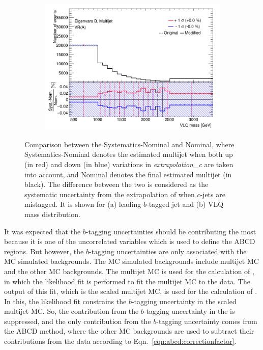 \begin{itemize}
\begin{figure}[hbt!]
		\begin{subfigure}{.35\textwidth}
			\centering
			\includegraphics[width=\linewidth,height=\textheight,keepaspectratio]{VR_B_VLQM_Multijets.png}
			\caption{}
			\label{fig:uncertainties:systematics:btagging:extra:c:vlqm}
		\end{subfigure}
		\caption{Comparison between the Systematics-Nominal and Nominal, where Systematics-Nominal denotes the estimated multijet when both up (in red) and down (in blue) variations in \textit{extrapolation\_c} are taken into account, and Nominal denotes the final estimated multijet (in black). The difference between the two is considered as the systematic uncertainty from the extrapolation of \pt when $c$-jets are mistagged. It is shown for (a) leading $b$-tagged jet \pt and (b) VLQ mass distribution.}
		\label{fig:uncertainties:systematics:btagging:extra:c}
	\end{figure}
\end{itemize}

It was expected that the $b$-tagging uncertainties should be contributing the most because it is one of the uncorrelated variables which is used to define the ABCD regions. But however, the $b$-tagging uncertainties are only associated with the MC simulated backgrounds. The MC simulated backgrounds include multijet MC and the other MC backgrounds. The multijet MC is used for the calculation of \R, in which the likelihood fit is performed to fit the multijet MC to the data. The output of this fit, which is the scaled multijet MC, is used for the calculation of \R. In this, the likelihood fit constrains the $b$-tagging uncertainty in the scaled multijet MC. So, the contribution from the $b$-tagging uncertainty in the \R is suppressed, and the only contribution from the $b$-tagging uncertainty comes from the ABCD method, where the other MC backgrounds are used to subtract their contributions from the data according to Eqn.\ \ref{eqn:abcd:correctionfactor}. 

